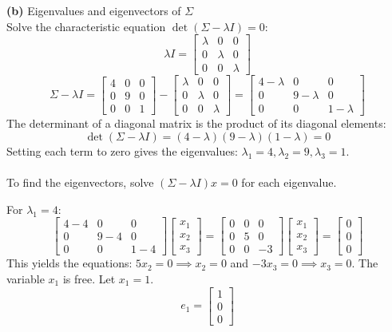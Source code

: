\documentclass{article}
\begin{document}
\noindent \textbf{(b)} Eigenvalues and eigenvectors of $\Sigma$ \\
Solve the characteristic equation $\det(\Sigma - \lambda I) = 0$:
\[
\lambda I = \begin{bmatrix} \lambda & 0 & 0 \\ 0 & \lambda & 0 \\ 0 & 0 & \lambda \end{bmatrix}
\]
\[
\Sigma - \lambda I = \begin{bmatrix} 4 & 0 & 0 \\ 0 & 9 & 0 \\ 0 & 0 & 1 \end{bmatrix} - \begin{bmatrix} \lambda & 0 & 0 \\ 0 & \lambda & 0 \\ 0 & 0 & \lambda \end{bmatrix} = \begin{bmatrix} 4-\lambda & 0 & 0 \\ 0 & 9-\lambda & 0 \\ 0 & 0 & 1-\lambda \end{bmatrix}
\]
The determinant of a diagonal matrix is the product of its diagonal elements:
\[
\det(\Sigma - \lambda I) = (4-\lambda)(9-\lambda)(1-\lambda) = 0
\]
Setting each term to zero gives the eigenvalues: $\lambda_1 = 4, \lambda_2 = 9, \lambda_3 = 1$. 
\\ \\
To find the eigenvectors, solve $(\Sigma - \lambda I)x = 0$ for each eigenvalue.

For $\lambda_1 = 4$:
\[
\begin{bmatrix} 4-4 & 0 & 0 \\ 0 & 9-4 & 0 \\ 0 & 0 & 1-4 \end{bmatrix} \begin{bmatrix} x_1 \\ x_2 \\ x_3 \end{bmatrix} = \begin{bmatrix} 0 & 0 & 0 \\ 0 & 5 & 0 \\ 0 & 0 & -3 \end{bmatrix} \begin{bmatrix} x_1 \\ x_2 \\ x_3 \end{bmatrix} = \begin{bmatrix} 0 \\ 0 \\ 0 \end{bmatrix}
\]
This yields the equations: $5x_2 = 0 \implies x_2 = 0$ and $-3x_3 = 0 \implies x_3 = 0$. The variable $x_1$ is free. Let $x_1 = 1$.
\[
e_1 = \begin{bmatrix} 1 \\ 0 \\ 0 \end{bmatrix}
\]
\end{document}
